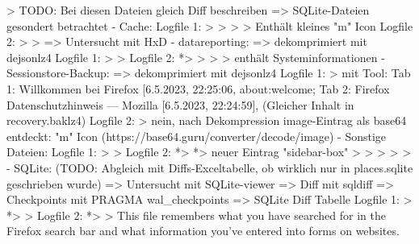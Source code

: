 > TODO: Bei diesen Dateien gleich Diff beschreiben => SQLite-Dateien gesondert betrachtet
- Cache: 
	Logfile 1:
		> %
		> %
		> %
		> %
			Enthält kleines "m" Icon
	Logfile 2:
		> %
		> %
			=> Untersucht mit HxD
- datareporting:
	=> dekomprimiert mit dejsonlz4
	Logfile 1:
		> %
		> %
	Logfile 2:
		*> %
		> %
		> %
		> %
			enthält Systeminformationen
- Sessionstore-Backup:
	=> dekomprimiert mit dejsonlz4
	Logfile 1:
		> %
			mit Tool: Tab 1:  Willkommen bei Firefox [6.5.2023, 22:25:06, about:welcome;
			Tab 2:  Firefox Datenschutzhinweis — Mozilla [6.5.2023, 22:24:59], %
			(Gleicher Inhalt in recovery.baklz4)
	Logfile 2:
		> %
			nein, nach Dekompression image-Eintrag als base64 entdeckt: "m" Icon
			(https://base64.guru/converter/decode/image)
- Sonstige Dateien:
	Logfile 1:
		> %
		> %
	Logfile 2:
		*> %
		*> %
			neuer Eintrag "sidebar-box"
		> %
		> %
		> %
		> %
		> %
- SQLite: (TODO: Abgleich mit Diffs-Exceltabelle, ob wirklich nur in places.sqlite geschrieben wurde)
	=> Untersucht mit SQLite-viewer
	=> Diff mit sqldiff
	=> Checkpoints mit PRAGMA wal\_checkpoints
	=> SQLite Diff Tabelle 
	Logfile 1:
		> %
		*> %
		> %
	Logfile 2:
		*> %
		> %
			This file remembers what you have searched for in the Firefox search bar and what information you’ve entered into forms on websites.
